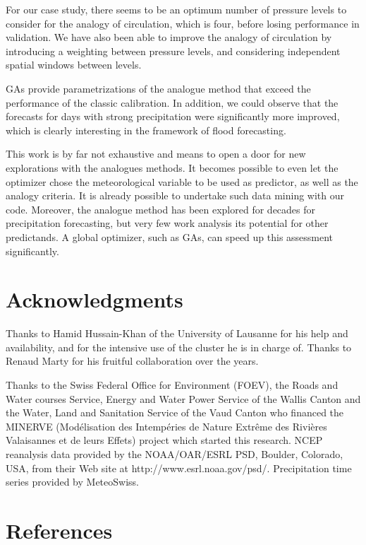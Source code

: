 \documentclass[5p]{elsarticle}
\begin{document}
For our case study, there seems to be an optimum number of pressure levels to consider for the analogy of circulation, which is four, before losing performance in validation. We have also been able to improve the analogy of circulation by introducing a weighting between pressure levels, and considering independent spatial windows between levels.

GAs provide parametrizations of the analogue method that exceed the performance of the classic calibration. In addition, we could observe that the forecasts for days with strong precipitation were significantly more improved, which is clearly interesting in the framework of flood forecasting.

This work is by far not exhaustive and means to open a door for new explorations with the analogues methods. It becomes possible to even let the optimizer chose the meteorological variable to be used as predictor, as well as the analogy criteria. It is already possible to undertake such data mining with our code. Moreover, the analogue method has been explored for decades for precipitation forecasting, but very few work analysis its potential for other predictands. A global optimizer, such as GAs, can speed up this assessment significantly.


\section*{Acknowledgments}
Thanks to Hamid Hussain-Khan of the University of Lausanne for his help and availability, and for the intensive use of the cluster he is in charge of. Thanks to Renaud Marty for his fruitful collaboration over the years.

Thanks to the Swiss Federal Office for Environment (FOEV), the Roads and Water courses Service, Energy and Water Power Service of the Wallis Canton and the Water, Land and Sanitation Service of the Vaud Canton who financed the MINERVE (Mod\'{e}lisation des Intemp\'{e}ries de Nature Extr\^{e}me des Rivi\`{e}res Valaisannes et de leurs Effets) project which started this research. NCEP reanalysis data provided by the NOAA/OAR/ESRL PSD, Boulder, Colorado, USA, from their Web site at http://www.esrl.noaa.gov/psd/. Precipitation time series provided by MeteoSwiss. 


\section*{References}


\end{document}
